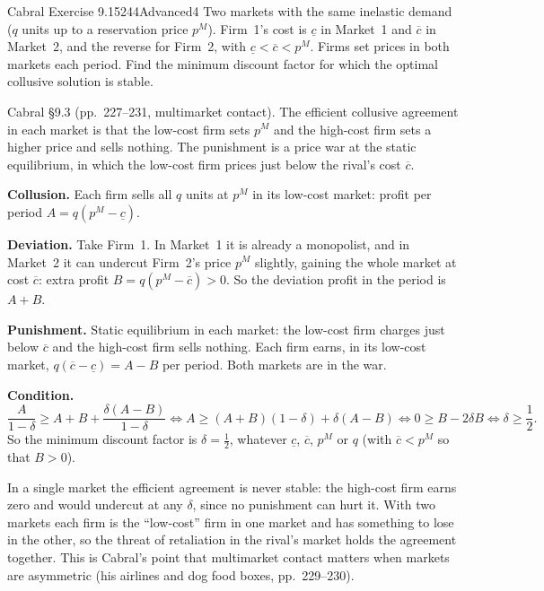 \begin{exsol}{Cabral Exercise 9.15}{244}{Advanced}{4}
\asked Two markets with the same inelastic demand ($q$ units up to a reservation price $p^M$). Firm~1's
cost is $\underline c$ in Market~1 and $\overline c$ in Market~2, and the reverse for Firm~2, with
$\underline c < \overline c < p^M$. Firms set prices in both markets each period. Find the minimum discount factor
for which the optimal collusive solution is stable.

\method Cabral \S9.3 (pp.~227--231, multimarket contact). The efficient collusive agreement in each market is
that the low-cost firm sets $p^M$ and the high-cost firm sets a higher price and sells nothing. The punishment is a
price war at the static equilibrium, in which the low-cost firm prices just below the rival's cost
$\overline c$.

\solution
\textbf{Collusion.} Each firm sells all $q$ units at $p^M$ in its low-cost market: profit per period
$A = q(p^M - \underline c)$.

\textbf{Deviation.} Take Firm~1. In Market~1 it is already a monopolist, and in Market~2 it can undercut Firm~2's price
$p^M$ slightly, gaining the whole market at cost $\overline c$: extra profit $B = q(p^M - \overline c) > 0$.
So the deviation profit in the period is $A + B$.

\textbf{Punishment.} Static equilibrium in each market: the low-cost firm charges just below $\overline c$ and
the high-cost firm sells nothing. Each firm earns, in its low-cost market, $q(\overline c - \underline c) = A - B$ per period.
Both markets are in the war.

\textbf{Condition.}
\[
  \frac{A}{1-\delta} \ge A + B + \frac{\delta (A - B)}{1-\delta}
  \iff A \ge (A + B)(1-\delta) + \delta(A - B)
  \iff 0 \ge B - 2\delta B
  \iff \delta \ge \frac12 .
\]
So the minimum discount factor is $\delta = \frac12$, whatever $\underline c$, $\overline c$, $p^M$ or $q$ (with
$\overline c < p^M$ so that $B > 0$).

\interp In a single market the efficient agreement is never stable: the high-cost firm earns zero and would
undercut at any $\delta$, since no punishment can hurt it. With two markets each firm is the ``low-cost'' firm in one
market and has something to lose in the other, so the threat of retaliation in the rival's market holds the agreement
together. This is Cabral's point that multimarket contact matters when markets are asymmetric
(his airlines and dog food boxes, pp.~229--230).


\end{exsol}
